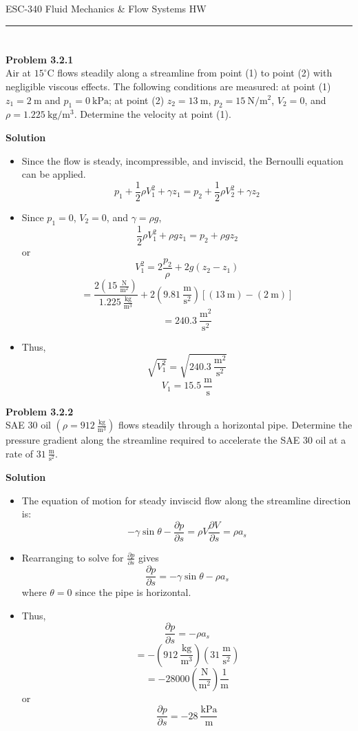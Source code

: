 ﻿\documentclass[12pt]{article}
\begin{document}
\begin{center}
{\LARGE ESC-340 Fluid Mechanics \& Flow Systems HW\par}
\end{center}
\hrule
\vspace{1.5em}
\section*{}
\textbf{Problem 3.2.1}\\
Air at $15^\circ\mathrm{C}$ flows steadily along a streamline from point (1) to point (2) with negligible viscous effects. The following conditions are measured: at point (1) $z_1=2\ \mathrm{m}$ and $p_1=0\ \mathrm{kPa}$; at point (2) $z_2=13\ \mathrm{m}$, $p_2=15\ \mathrm{N/m^2}$, $V_2=0$, and $\rho=1.225\ \mathrm{kg/m^3}$. Determine the velocity at point (1).

\textbf{Solution}
\begin{itemize}
    \item Since the flow is steady, incompressible, and inviscid, the Bernoulli equation can be applied.
    \[p_1+\frac{1}{2}\rho V_1^2+\gamma z_1=p_2+\frac{1}{2}\rho V_2^2+\gamma z_2\]
    \item Since $p_1=0$, $V_2=0$, and $\gamma=\rho g$,
    \[\frac{1}{2}\rho V_1^2+\rho gz_1=p_2+\rho gz_2\]
    or
    \[V_1^2=2\frac{p_2}{\rho}+2g(z_2-z_1)\]
    \[=\frac{2\left(15\ \frac{\mathrm{N}}{\mathrm{m}^2}\right)}{1.225\ \frac{\mathrm{kg}}{\mathrm{m}^3}}+2\left(9.81\ \frac{\mathrm{m}}{\mathrm{s}^2}\right)\left[(13\ \mathrm{m})-(2\ \mathrm{m})\right]\]
    \[=240.3\ \frac{\mathrm{m}^2}{\mathrm{s}^2}\]
    \item Thus,
    \[\sqrt{V_1^2}=\sqrt{240.3\ \frac{\mathrm{m}^2}{\mathrm{s}^2}}\]
    \[\boxed{V_1=15.5\ \frac{\mathrm{m}}{\mathrm{s}}}\]
\end{itemize}


\textbf{Problem 3.2.2}\\
SAE 30 oil $\left(\rho=912\ \frac{\mathrm{kg}}{\mathrm{m}^3}\right)$ flows steadily through a horizontal pipe. Determine the pressure gradient along the streamline required to accelerate the SAE 30 oil at a rate of $31\ \frac{\mathrm{m}}{\mathrm{s}^2}$.

\textbf{Solution}
\begin{itemize}
    \item The equation of motion for steady inviscid flow along the streamline direction is:
    \[-\gamma\sin\theta-\frac{\partial p}{\partial s}=\rho V\frac{\partial V}{\partial s}=\rho a_s\]
    \item Rearranging to solve for $\frac{\partial p}{\partial s}$ gives
    \[\frac{\partial p}{\partial s}=-\gamma\sin\theta-\rho a_s\]
    where $\theta=0$ since the pipe is horizontal.
    \item Thus,
    \[\frac{\partial p}{\partial s}=-\rho a_s\]
    \[=-\left(912\ \frac{\mathrm{kg}}{\mathrm{m}^3}\right)\left(31\ \frac{\mathrm{m}}{\mathrm{s}^2}\right)\]
    \[=-28000\left(\frac{\mathrm{N}}{\mathrm{m}^2}\right)\frac{1}{\mathrm{m}}\]
    or
    \[\boxed{\frac{\partial p}{\partial s}=-28\ \frac{\mathrm{kPa}}{\mathrm{m}}}\]
\end{itemize}
\end{document}
